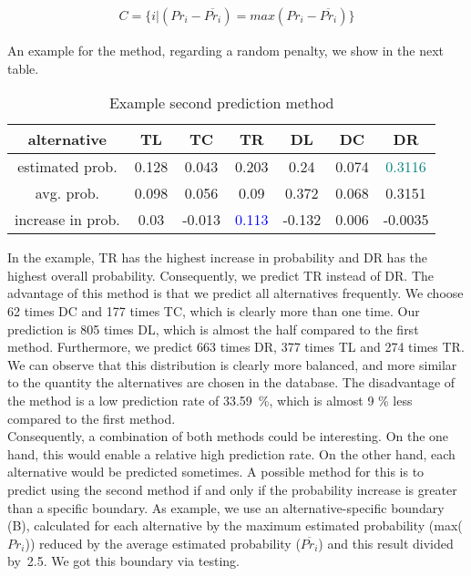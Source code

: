 \documentclass[12pt,dvipsnames]{article}%
\begin{document}
 \begin{center}
 \begin{align}
 C = \{ i | (Pr_i - \overline{Pr_i}) = max(Pr_i - \overline{Pr_i}) \}
 \end{align}
 \end{center}
 
 \vspace{-0.35cm}
 
 An example for the method, regarding a random penalty, we show in the next table.

  \begin{table}[ht]
\caption{Example second prediction method}
\centering
\small
\begin{tabular}{  c |  c | c |  c | c | c | c  }
   alternative & TL  & TC & TR & DL & DC & DR   \\
   \hline

estimated prob.  & 0.128 &  0.043  &  0.203  & 0.24 & 0.074 & \textcolor{teal}{0.3116}    \\  

avg. prob.  & 0.098  & 0.056    & 0.09 & 0.372 & 0.068 & 0.3151    \\ 

\hline

increase in prob.   & 0.03  & -0.013  &  \textcolor{blue}{0.113} & -0.132 & 0.006 & -0.0035    \\ 

 \end{tabular}
 \end{table}
 
 \vspace{-0.2cm}
 
 In the example, TR has the highest increase in probability and DR has the highest overall probability. Consequently, we predict TR instead of DR. The advantage of this method is that we predict all alternatives frequently. We choose 62 times DC and 177 times TC, which is clearly more than one time. Our prediction is 805 times DL, which is almost the half compared to the first method. Furthermore, we predict 663 times DR, 377 times TL and 274  times TR. We can observe that this distribution is clearly more balanced, and more similar to the quantity the alternatives are chosen in the database. The disadvantage of the method is a low prediction rate of \mbox{33.59 \%,} which is almost 9 \% less compared to the first method. \\
%
Consequently, a combination of both methods could be interesting. On the one hand, this would enable a relative high prediction rate. On the other hand, each alternative would be predicted sometimes. A possible method for this is to predict using the second method if and only if the probability increase is greater than a specific boundary. As example, we use an alternative-specific boundary (B), calculated for each alternative by the maximum estimated probability (max($Pr_i$)) reduced by the average estimated probability ($\overline{Pr_i}$) and this result divided \mbox{by 2.5}. We got this boundary via testing.
 
\end{document}
